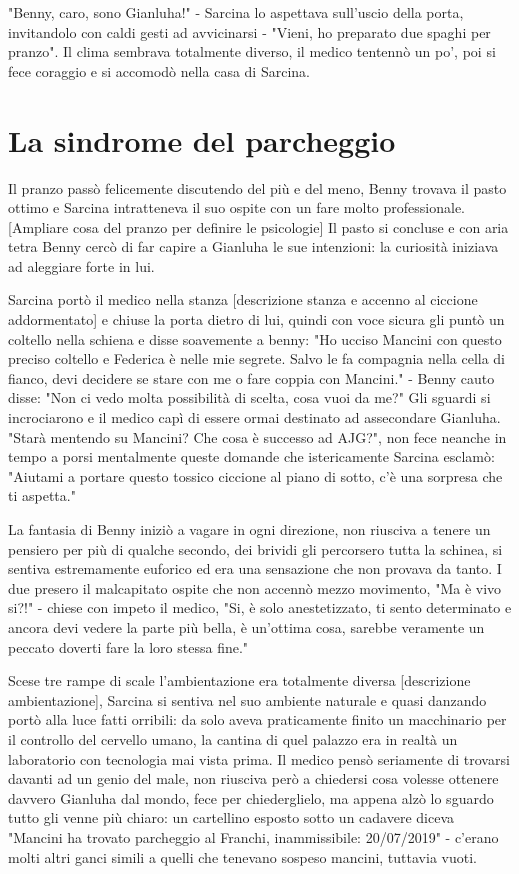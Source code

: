 "Benny, caro, sono Gianluha!" - Sarcina lo aspettava sull'uscio della porta, invitandolo con caldi gesti ad avvicinarsi - "Vieni, ho preparato due spaghi per pranzo".
Il clima sembrava totalmente diverso, il medico tentennò un po', poi si fece coraggio e si accomodò nella casa di Sarcina.

\section{La sindrome del parcheggio}

Il pranzo passò felicemente discutendo del più e del meno, Benny trovava il pasto ottimo e Sarcina intratteneva il suo ospite con un fare molto professionale. [Ampliare cosa del pranzo per definire le psicologie]
Il pasto si concluse e con aria tetra Benny cercò di far capire a Gianluha le sue intenzioni: la curiosità iniziava ad aleggiare forte in lui.

Sarcina portò il medico nella stanza [descrizione stanza e accenno al ciccione addormentato] e chiuse la porta dietro di lui, quindi con voce sicura gli puntò un coltello nella schiena e disse soavemente a benny: "Ho ucciso Mancini con questo preciso coltello e Federica è nelle mie segrete. Salvo le fa compagnia nella cella di fianco, devi decidere se stare con me o fare coppia con Mancini." - Benny cauto disse: "Non ci vedo molta possibilità di scelta, cosa vuoi da me?"
Gli sguardi si incrociarono e il medico capì di essere ormai destinato ad assecondare Gianluha. "Starà mentendo su Mancini? Che cosa è successo ad AJG?", non fece neanche in tempo a porsi mentalmente queste domande che istericamente Sarcina esclamò: "Aiutami a portare questo tossico ciccione al piano di sotto, c'è una sorpresa che ti aspetta."

La fantasia di Benny iniziò a vagare in ogni direzione, non riusciva a tenere un pensiero per più di qualche secondo, dei brividi gli percorsero tutta la schinea, si sentiva estremamente euforico ed era una sensazione che non provava da tanto. I due presero il malcapitato ospite che non accennò mezzo movimento, "Ma è vivo si?!" - chiese con impeto il medico, "Si, è solo anestetizzato, ti sento determinato e ancora devi vedere la parte più bella, è un'ottima cosa, sarebbe veramente un peccato doverti fare la loro stessa fine."

Scese tre rampe di scale l'ambientazione era totalmente diversa [descrizione ambientazione], Sarcina si sentiva nel suo ambiente naturale e quasi danzando portò alla luce fatti orribili: da solo aveva praticamente finito un macchinario per il controllo del cervello umano, la cantina di quel palazzo era in realtà un laboratorio con tecnologia mai vista prima. 
Il medico pensò seriamente di trovarsi davanti ad un genio del male, non riusciva però a chiedersi cosa volesse ottenere davvero Gianluha dal mondo, fece per chiederglielo, ma appena alzò lo sguardo tutto gli venne più chiaro: un cartellino esposto sotto un cadavere diceva "Mancini ha trovato parcheggio al Franchi, inammissibile: 20/07/2019" - c'erano molti altri ganci simili a quelli che tenevano sospeso mancini, tuttavia vuoti. 

